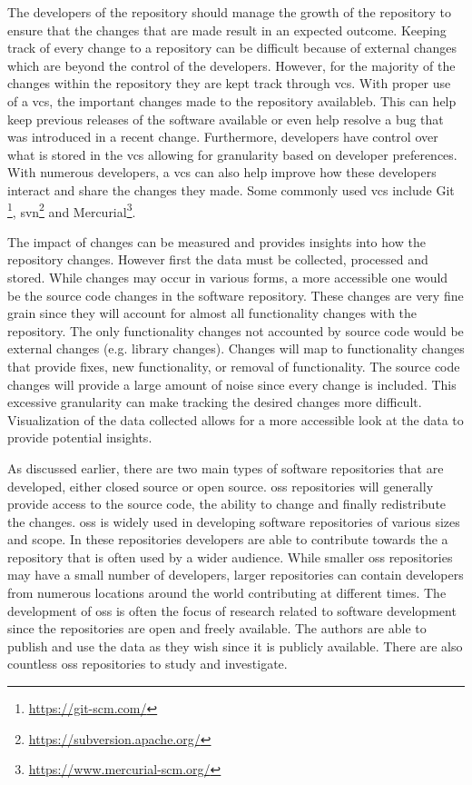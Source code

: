 The developers of the repository should manage the growth of the repository to ensure that the changes that are made result in an expected outcome. Keeping track of every change to a repository can be difficult because of external changes which are beyond the control of the developers. However, for the majority of the changes within the repository they are kept track through \gls{vcs}. With proper use of a \gls{vcs}, the important changes made to the repository availableb. This can help keep previous releases of the software available or even help resolve a bug that was introduced in a recent change. Furthermore, developers have control over what is stored in the \gls{vcs} allowing for granularity based on developer preferences. With numerous developers, a \gls{vcs} can also help improve how these developers interact and share the changes they made. Some commonly used \gls{vcs} include Git \footnote{\url{https://git-scm.com/}}, \gls{svn}\footnote{\url{https://subversion.apache.org/}} and Mercurial\footnote{\url{https://www.mercurial-scm.org/}}.

The impact of changes can be measured and provides insights into how the repository changes. However first the data must be collected, processed and stored. While changes may occur in various forms, a more accessible one would be the source code changes in the software repository. These changes are very fine grain since they will account for almost all functionality changes with the repository. The only functionality changes not accounted by source code would be external changes (e.g. library changes). Changes will map to functionality changes that provide fixes, new functionality, or removal of functionality. The source code changes will provide a large amount of noise since every change is included. This excessive granularity can make tracking the desired changes more difficult. Visualization of the data collected allows for a more accessible look at the data to provide potential insights.



As discussed earlier, there are two main types of software repositories that are developed, either closed source or open source. \gls{oss} repositories will generally provide access to the source code, the ability to change and finally redistribute the changes. \gls{oss} is widely used in developing software repositories of various sizes and scope. In these repositories developers are able to contribute towards the a repository that is often used by a wider audience. While smaller \gls{oss} repositories may have a small number of developers, larger repositories can contain developers from numerous locations around the world contributing at different times. The development of \gls{oss} is often the focus of research related to software development since the repositories are open and freely available. The authors are able to publish and use the data as they wish since it is publicly available. There are also countless \gls{oss} repositories to study and investigate.

